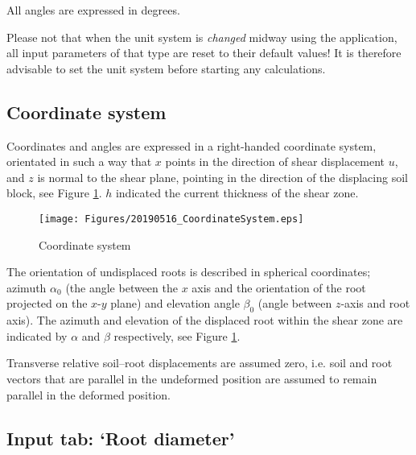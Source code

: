 \documentclass[a4 paper, 11  pt]{article}
\begin{document}
All angles are expressed in degrees. 

Please not that when the unit system is \textit{changed} midway using the application, all input parameters of that type are reset to their default values! It is therefore advisable to set the unit system before starting any calculations.

\subsection{Coordinate system}

Coordinates and angles are expressed in a right-handed coordinate system, orientated in such a way that $x$ points in the direction of shear displacement $u$, and $z$ is normal to the shear plane, pointing in the direction of the displacing soil block, see Figure \ref{fig:coordsystem}. $h$ indicated the current thickness of the shear zone.
\begin{figure}
	\centering
		\texttt{[image: Figures/20190516\_CoordinateSystem.eps]}
	\caption{Coordinate system}
	\label{fig:coordsystem}
\end{figure}

The orientation of undisplaced roots is described in spherical coordinates; azimuth $\alpha_0$ (the angle between the $x$ axis and the orientation of the root projected on the $x$-$y$ plane) and elevation angle $\beta_0$ (angle between $z$-axis and root axis). The azimuth and elevation of the displaced root within the shear zone are indicated by $\alpha$ and $\beta$ respectively, see Figure \ref{fig:coordsystem}.

Transverse relative soil--root displacements are assumed zero, i.e. soil and root vectors that are parallel in the undeformed position are assumed to remain parallel in the deformed position. 

\subsection{Input tab: `Root diameter'}
\label{sec:inputrootdiameters}
\end{document}
